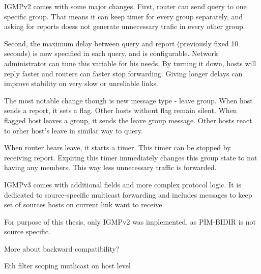 IGMPv2 \cite{rfc2236} comes with some major changes. First, router can send query to one
specific group. That means it can keep timer for every group separately, and
asking for reports doess not generate unnecessary trafic in every other group.

Second, the maximum delay between query and report (previously fixed 10
seconds) is now specified in each query, and is configurable. Network
administrator can tune this variable for his needs. By turning it down, hosts
will reply faster and routers can faster stop forwarding. Giving longer delays
can improve stability on very slow or unreliable links.

The most notable change though is new message type - leave group. When host
sends a report, it sets a flag. Other hosts without flag remain silent. When
flagged host leaves a group, it sends the leave group message. Other hosts
react to orher host's leave in similar way to query.

When router hears leave, it starts a timer. This timer can be stopped by
receiving report. Expiring this timer immediately changes this group state to
not having any members. This way less unnecessary traffic is forwarded.

IGMPv3 comes with additional fields and more complex protocol logic. It is
dedicated to source-specific multicast forwarding and includes messages to keep
set of sources hosts on current link want to receive.

For purpose of this thesis, only IGMPv2 was implemented, as PIM-BIDIR is not
source specific.

\TODO More about backward compatibility?




\TODO Eth filter
\TODO scoping
\TODO mutlicast on host level
